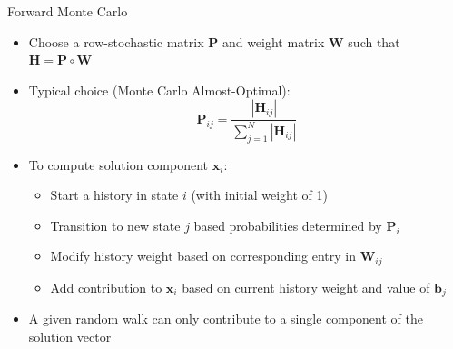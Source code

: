 \documentclass{beamer}
\begin{document}
\begin{frame}{Forward Monte Carlo}
\begin{itemize}
  \item Choose a row-stochastic matrix $\mathbf{P}$ and weight matrix
    $\mathbf{W}$ such that $\mathbf{H} = \mathbf{P} \circ \mathbf{W}$
  \item Typical choice (Monte Carlo Almost-Optimal):
    \begin{equation*}
      \mathbf{P}_{ij} = \frac{| \mathbf{H}_{ij}| }
      {\sum_{j=1}^{N} | \mathbf{H}_{ij} | }
    \end{equation*}
  \item To compute solution component $\mathbf{x}_i$:
    \begin{itemize}
      \item Start a history in state $i$ (with initial weight of 1)
      \item Transition to new state $j$ based probabilities determined by
        $\mathbf{P}_i$
      \item Modify history weight based on corresponding entry in
        $\mathbf{W}_{ij}$
      \item Add contribution to $\mathbf{x}_i$ based on current history weight
        and value of $\mathbf{b}_j$
    \end{itemize}
  \item A given random walk can only contribute to a single component of
    the solution vector
\end{itemize}
\end{frame}
\end{document}

